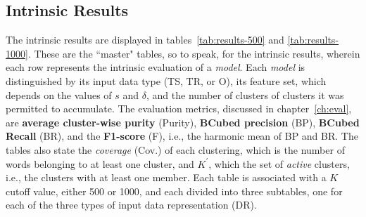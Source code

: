 \subsection{Intrinsic Results}
	The intrinsic results are displayed in tables~\ref{tab:results-500} and \ref{tab:results-1000}. 
	These are the ``master" tables, so to speak, for the intrinsic results, wherein each row %
	represents the intrinsic evaluation of a \emph{model}. %
	Each \emph{model} is distinguished by its input data type (TS, TR, or O), its feature set, which depends 
	on the values of $s$ and $\delta$, and the number of clusters of clusters it was permitted to accumulate. 
	The evaluation metrics, discussed in chapter~\ref{ch:eval}, are \textbf{average cluster-wise purity} (Purity), 
	\textbf{BCubed precision} (BP), \textbf{BCubed Recall} (BR), 
	and the \textbf{F1-score} (F), i.e., the harmonic mean of BP and BR.  The tables also state the \emph{coverage} 
	(Cov.) of each clustering, which is the number of words belonging to at least one cluster, and $K^{\prime}$, 
	which the set of \emph{active} clusters, i.e., the clusters with at least one member. 
	Each table  is associated with a $K$ cutoff value, either 500 or 1000, and each divided into three subtables, 
	one for each of the three types of input data representation (DR).

